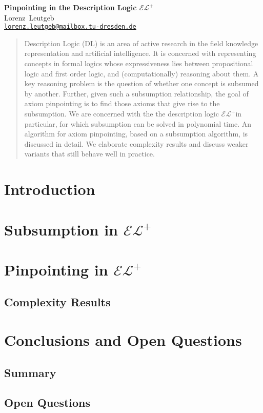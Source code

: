 \documentclass[a4paper]{article}
\newcommand{\elp}{\ensuremath{\mathcal{EL^+}}}
\begin{document}
\begin{center}

{\bfseries\Large{Pinpointing in the Description Logic \elp}\\[3mm]}
Lorenz~Leutgeb \\ \href{mailto:lorenz.leutgeb@mailbox.tu-dresden.de}{\texttt{lorenz.leutgeb@mailbox.tu-dresden.de}}

\end{center}
\begin{abstract}
Description Logic (DL) is an area of active research in the field knowledge representation and artificial intelligence. It is concerned with representing concepts in formal logics whose expressiveness lies between propositional logic and first order logic, and (computationally) reasoning about them.
A key reasoning problem is the question of whether one concept is subsumed by another. Further, given such a subsumption relationship, the goal of axiom pinpointing is to find those axioms that give rise to the subsumption.
We are concerned with the the description logic \elp in particular, for which subsumption can be solved in polynomial time. An algorithm for axiom pinpointing, based on a subsumption algorithm, is discussed
in detail. We elaborate complexity results and discuss weaker variants that still behave well in practice.
\end{abstract}

\section{Introduction}
\label{intro}

\section{Subsumption in \elp}
\label{sec:subs}

\section{Pinpointing in \elp}
\label{sec:prelim:lp}

\subsection{Complexity Results}

\section{Conclusions and Open Questions}
\label{sec:con}

\subsection{Summary}

\subsection{Open Questions}


\end{document}
